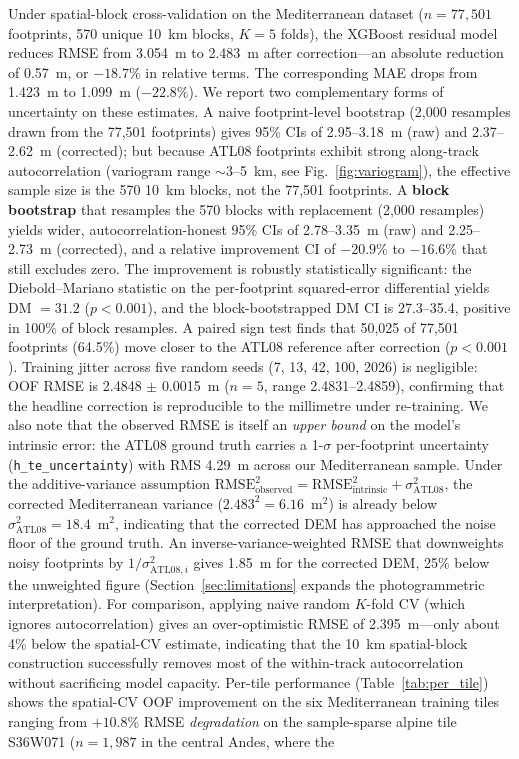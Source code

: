 \documentclass[preprint,authoryear,number]{elsarticle}
\begin{document}
Under spatial-block cross-validation on the Mediterranean dataset ($n = 77{,}501$ footprints, 570 unique \SI{10}{\kilo\meter} blocks, $K = 5$ folds), the XGBoost residual model reduces RMSE from \SI{3.054}{\meter} to \SI{2.483}{\meter} after correction---an absolute reduction of \SI{0.57}{\meter}, or \textbf{$-18.7\%$} in relative terms. The corresponding MAE drops from \SI{1.423}{\meter} to \SI{1.099}{\meter} ($-22.8\%$). We report two complementary forms of uncertainty on these estimates. A naive footprint-level bootstrap (2{,}000 resamples drawn from the 77{,}501 footprints) gives 95\% CIs of 2.95--\SI{3.18}{\meter} (raw) and 2.37--\SI{2.62}{\meter} (corrected); but because ATL08 footprints exhibit strong along-track autocorrelation (variogram range $\sim$3--\SI{5}{\kilo\meter}, see Fig.~\ref{fig:variogram}), the effective sample size is the 570 \SI{10}{\kilo\meter} blocks, not the 77{,}501 footprints. A \textbf{block bootstrap} that resamples the 570 blocks with replacement (2{,}000 resamples) yields wider, autocorrelation-honest 95\% CIs of 2.78--\SI{3.35}{\meter} (raw) and 2.25--\SI{2.73}{\meter} (corrected), and a relative improvement CI of $-20.9\%$ to $-16.6\%$ that still excludes zero. The improvement is robustly statistically significant: the Diebold--Mariano statistic on the per-footprint squared-error differential yields DM $= 31.2$ ($p < 0.001$), and the block-bootstrapped DM CI is 27.3--35.4, positive in 100\% of block resamples. A paired sign test finds that 50{,}025 of 77{,}501 footprints (64.5\%) move closer to the ATL08 reference after correction ($p < 0.001$). Training jitter across five random seeds (7, 13, 42, 100, 2026) is negligible: OOF RMSE is 2.4848 $\pm$ \SI{0.0015}{\meter} ($n=5$, range 2.4831--2.4859), confirming that the headline correction is reproducible to the millimetre under re-training. We also note that the observed RMSE is itself an \emph{upper bound} on the model's intrinsic error: the ATL08 ground truth carries a 1-$\sigma$ per-footprint uncertainty (\texttt{h\_te\_uncertainty}) with RMS \SI{4.29}{\meter} across our Mediterranean sample. Under the additive-variance assumption $\text{RMSE}_{\text{observed}}^{2} = \text{RMSE}_{\text{intrinsic}}^{2} + \sigma_{\text{ATL08}}^{2}$, the corrected Mediterranean variance ($2.483^{2} = 6.16$~m$^{2}$) is already below $\sigma_{\text{ATL08}}^{2} = 18.4$~m$^{2}$, indicating that the corrected DEM has approached the noise floor of the ground truth. An inverse-variance-weighted RMSE that downweights noisy footprints by $1/\sigma_{\text{ATL08},i}^{2}$ gives \SI{1.85}{\meter} for the corrected DEM, 25\% below the unweighted figure (Section~\ref{sec:limitations} expands the photogrammetric interpretation). For comparison, applying naive random $K$-fold CV (which ignores autocorrelation) gives an over-optimistic RMSE of \SI{2.395}{\meter}---only about 4\% below the spatial-CV estimate, indicating that the \SI{10}{\kilo\meter} spatial-block construction successfully removes most of the within-track autocorrelation without sacrificing model capacity. Per-tile performance (Table~\ref{tab:per_tile}) shows the spatial-CV OOF improvement on the six Mediterranean training tiles ranging from $+10.8\%$ RMSE \emph{degradation} on the sample-sparse alpine tile S36W071 ($n = 1{,}987$ in the central Andes, where the 
\end{document}
